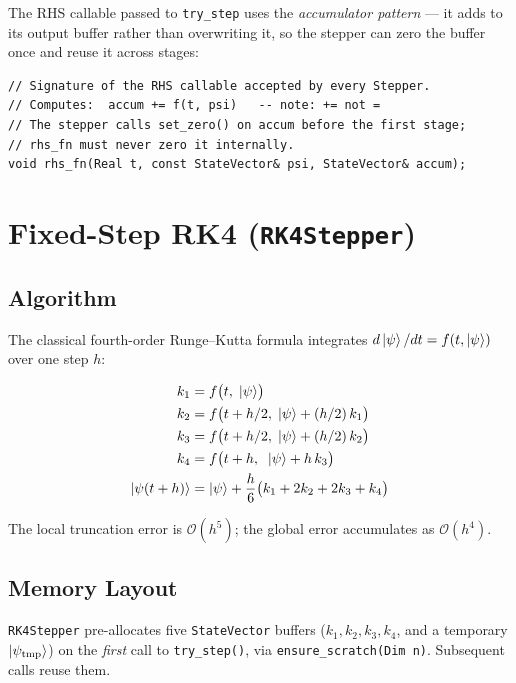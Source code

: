 \documentclass[11pt,a4paper,twoside]{book}
\newcommand{\Order}{\mathcal{O}}
\newcommand{\code}[1]{\texttt{\small#1}}
\theoremstyle{definition}
\theoremstyle{remark}
\begin{document}
The RHS callable passed to \code{try\_step} uses the
\emph{accumulator pattern} — it adds to its output buffer rather
than overwriting it, so the stepper can zero the buffer once and
reuse it across stages:

\begin{verbatim}
// Signature of the RHS callable accepted by every Stepper.
// Computes:  accum += f(t, psi)   -- note: += not =
// The stepper calls set_zero() on accum before the first stage;
// rhs_fn must never zero it internally.
void rhs_fn(Real t, const StateVector& psi, StateVector& accum);
\end{verbatim}

\section{Fixed-Step RK4 (\texttt{RK4Stepper})}
\label{sec:rk4}

\subsection{Algorithm}
\label{subsec:rk4-algorithm}

The classical fourth-order Runge--Kutta formula integrates
$d\ket{\psi}/dt = f(t, \ket{\psi})$ over one step $h$:

\begin{align}
  k_1 &= f\bigl(t,\; \ket{\psi}\bigr) \label{eq:rk4-k1}\\
  k_2 &= f\bigl(t + h/2,\; \ket{\psi} + (h/2)\,k_1\bigr) \label{eq:rk4-k2}\\
  k_3 &= f\bigl(t + h/2,\; \ket{\psi} + (h/2)\,k_2\bigr) \label{eq:rk4-k3}\\
  k_4 &= f\bigl(t + h,\;\; \ket{\psi} + h\,k_3\bigr) \label{eq:rk4-k4}\\
  \ket{\psi(t+h)} &= \ket{\psi} + \frac{h}{6}\bigl(k_1 + 2k_2 + 2k_3 + k_4\bigr)
  \label{eq:rk4-update}
\end{align}

The local truncation error is $\Order(h^5)$; the global error
accumulates as $\Order(h^4)$.

\subsection{Memory Layout}
\label{subsec:rk4-memory}

\code{RK4Stepper} pre-allocates five \code{StateVector} buffers
($k_1, k_2, k_3, k_4$, and a temporary $\ket{\psi_{\mathrm{tmp}}}$)
on the \emph{first} call to \code{try\_step()}, via
\code{ensure\_scratch(Dim n)}. Subsequent calls reuse them.
\end{document}
